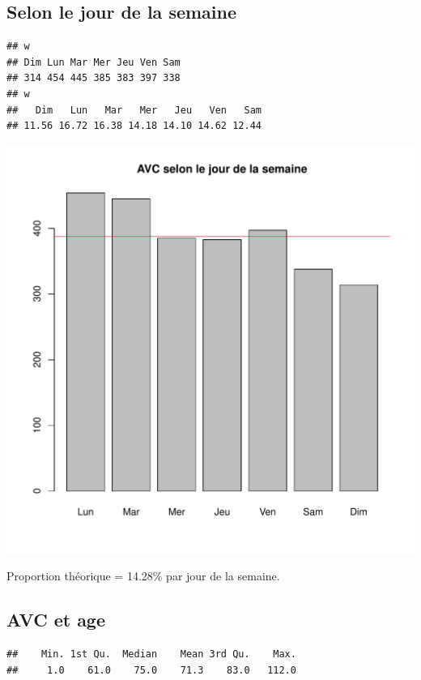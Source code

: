 \documentclass[12pt,english,french,twoside]{report}\usepackage[]{graphicx}\usepackage[]{color}
\makeatletter
\def\maxwidth{ %
  \ifdim\Gin@nat@width>\linewidth
    \linewidth
  \else
    \Gin@nat@width
  \fi
}
\newenvironment{kframe}{%
 \def\at@end@of@kframe{}%
 \ifinner\ifhmode%
  \def\at@end@of@kframe{\end{minipage}}%
  \begin{minipage}{\columnwidth}%
 \fi\fi%
 \def\FrameCommand##1{\hskip\@totalleftmargin \hskip-\fboxsep
 \colorbox{shadecolor}{##1}\hskip-\fboxsep
     \hskip-\linewidth \hskip-\@totalleftmargin \hskip\columnwidth}%
 \MakeFramed {\advance\hsize-\width
   \@totalleftmargin\z@ \linewidth\hsize
   \@setminipage}}%
 {\par\unskip\endMakeFramed%
 \at@end@of@kframe}
\newenvironment{knitrout}{}{} %
\makeatother
\begin{document}
\subsection*{Selon le jour de la semaine}

\begin{knitrout}
\color{fgcolor}\begin{kframe}
\begin{verbatim}
## w
## Dim Lun Mar Mer Jeu Ven Sam 
## 314 454 445 385 383 397 338
## w
##   Dim   Lun   Mar   Mer   Jeu   Ven   Sam 
## 11.56 16.72 16.38 14.18 14.10 14.62 12.44
\end{verbatim}
\end{kframe}
\includegraphics[width=\maxwidth]{figure/avc_jour_semaine} 

\end{knitrout}

Proportion théorique = 14.28\% par jour de la semaine.

\subsection*{AVC et age}
\begin{knitrout}
\color{fgcolor}\begin{kframe}
\begin{verbatim}
##    Min. 1st Qu.  Median    Mean 3rd Qu.    Max. 
##     1.0    61.0    75.0    71.3    83.0   112.0
\end{verbatim}
\end{kframe}
\end{knitrout}
\end{document}

